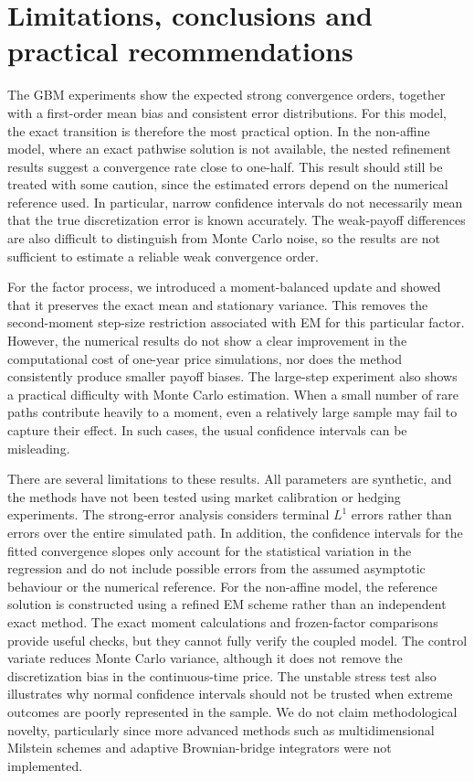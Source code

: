 \section{Limitations, conclusions and practical recommendations}
\label{sec:conclusions}
The GBM experiments show the expected strong convergence orders, together with a first-order mean bias and consistent error distributions. For this model, the exact transition is therefore the most practical option. In the non-affine model, where an exact pathwise solution is not available, the nested refinement results suggest a convergence rate close to one-half. This result should still be treated with some caution, since the estimated errors depend on the numerical reference used. In particular, narrow confidence intervals do not necessarily mean that the true discretization error is known accurately. The weak-payoff differences are also difficult to distinguish from Monte Carlo noise, so the results are not sufficient to estimate a reliable weak convergence order.

For the factor process, we introduced a moment-balanced update and showed that it preserves the exact mean and stationary variance. This removes the second-moment step-size restriction associated with EM for this particular factor. However, the numerical results do not show a clear improvement in the computational cost of one-year price simulations, nor does the method consistently produce smaller payoff biases. The large-step experiment also shows a practical difficulty with Monte Carlo estimation. When a small number of rare paths contribute heavily to a moment, even a relatively large sample may fail to capture their effect. In such cases, the usual confidence intervals can be misleading.

There are several limitations to these results. All parameters are synthetic, and the methods have not been tested using market calibration or hedging experiments. The strong-error analysis considers terminal $L^1$ errors rather than errors over the entire simulated path. In addition, the confidence intervals for the fitted convergence slopes only account for the statistical variation in the regression and do not include possible errors from the assumed asymptotic behaviour or the numerical reference. For the non-affine model, the reference solution is constructed using a refined EM scheme rather than an independent exact method. The exact moment calculations and frozen-factor comparisons provide useful checks, but they cannot fully verify the coupled model. The control variate reduces Monte Carlo variance, although it does not remove the discretization bias in the continuous-time price. The unstable stress test also illustrates why normal confidence intervals should not be trusted when extreme outcomes are poorly represented in the sample. We do not claim methodological novelty, particularly since more advanced methods such as multidimensional Milstein schemes and adaptive Brownian-bridge integrators were not implemented.

